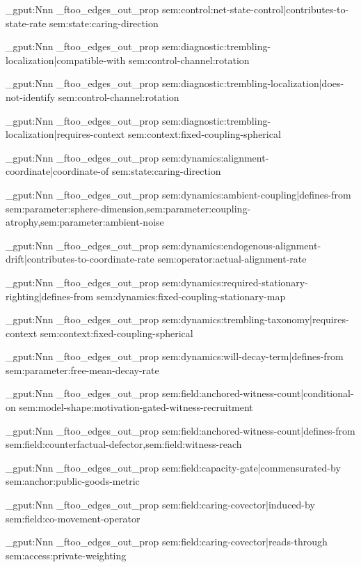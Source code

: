 \prop_gput:Nnn \g_ftoo_edges_out_prop { sem:control:net-state-control|contributes-to-state-rate } { sem:state:caring-direction }

\prop_gput:Nnn \g_ftoo_edges_out_prop { sem:diagnostic:trembling-localization|compatible-with } { sem:control-channel:rotation }

\prop_gput:Nnn \g_ftoo_edges_out_prop { sem:diagnostic:trembling-localization|does-not-identify } { sem:control-channel:rotation }

\prop_gput:Nnn \g_ftoo_edges_out_prop { sem:diagnostic:trembling-localization|requires-context } { sem:context:fixed-coupling-spherical }

\prop_gput:Nnn \g_ftoo_edges_out_prop { sem:dynamics:alignment-coordinate|coordinate-of } { sem:state:caring-direction }

\prop_gput:Nnn \g_ftoo_edges_out_prop { sem:dynamics:ambient-coupling|defines-from } { sem:parameter:sphere-dimension,sem:parameter:coupling-atrophy,sem:parameter:ambient-noise }

\prop_gput:Nnn \g_ftoo_edges_out_prop { sem:dynamics:endogenous-alignment-drift|contributes-to-coordinate-rate } { sem:operator:actual-alignment-rate }

\prop_gput:Nnn \g_ftoo_edges_out_prop { sem:dynamics:required-stationary-righting|defines-from } { sem:dynamics:fixed-coupling-stationary-map }

\prop_gput:Nnn \g_ftoo_edges_out_prop { sem:dynamics:trembling-taxonomy|requires-context } { sem:context:fixed-coupling-spherical }

\prop_gput:Nnn \g_ftoo_edges_out_prop { sem:dynamics:will-decay-term|defines-from } { sem:parameter:free-mean-decay-rate }

\prop_gput:Nnn \g_ftoo_edges_out_prop { sem:field:anchored-witness-count|conditional-on } { sem:model-shape:motivation-gated-witness-recruitment }

\prop_gput:Nnn \g_ftoo_edges_out_prop { sem:field:anchored-witness-count|defines-from } { sem:field:counterfactual-defector,sem:field:witness-reach }

\prop_gput:Nnn \g_ftoo_edges_out_prop { sem:field:capacity-gate|commensurated-by } { sem:anchor:public-goods-metric }

\prop_gput:Nnn \g_ftoo_edges_out_prop { sem:field:caring-covector|induced-by } { sem:field:co-movement-operator }

\prop_gput:Nnn \g_ftoo_edges_out_prop { sem:field:caring-covector|reads-through } { sem:access:private-weighting }


